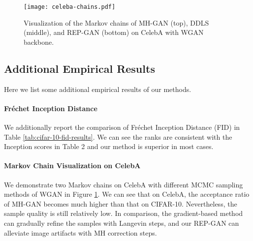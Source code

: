 \documentclass[runningheads]{llncs}
\newcommand{\<}{\left\langle}
\renewcommand{\>}{\right\rangle}
\begin{document}
\begin{figure}[t]
    \centering
    \texttt{[image: celeba-chains.pdf]}
    \caption{Visualization of the Markov chains of MH-GAN (top), DDLS (middle), and REP-GAN (bottom) on CelebA with WGAN backbone.}
    \label{fig:celeba-chains}
\end{figure}


\subsection{Additional Empirical Results}
Here we list some additional empirical results of our methods.

\paragraph{\textbf{Fréchet Inception Distance}}
We additionally report the comparison of Fréchet Inception Distance (FID) in Table \ref{tab:cifar-10-fid-results}. 
We can see the ranks are consistent with the Inception scores in Table 2 and our method is superior in most cases.


\paragraph{\textbf{Markov Chain Visualization on CelebA}}
We demonstrate two Markov chains on CelebA with different MCMC sampling methods of WGAN in Figure \ref{fig:celeba-chains}. We can see that on CelebA, the acceptance ratio of MH-GAN becomes much higher than that on CIFAR-10. Nevertheless, the sample quality is still relatively low. In comparison, the gradient-based method can gradually refine the samples with Langevin steps, and our REP-GAN can alleviate image artifacts with MH correction steps.
\end{document}
